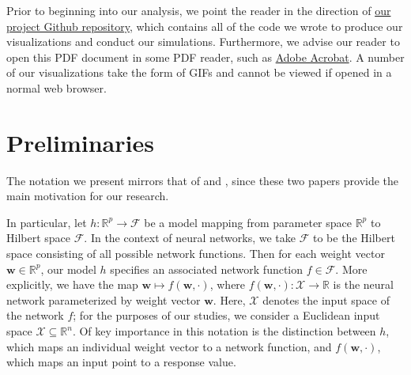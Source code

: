 \documentclass{article}
\begin{document}
Prior to beginning into our analysis, we point the reader in the direction of \href{https://github.com/smithhenryd/NN-Kernel-and-Rich-Regimes}{our project Github repository}, which contains all of the code we wrote to produce our visualizations and conduct our simulations. Furthermore, we advise our reader to open this PDF document in some PDF reader, such as \href{https://www.adobe.com/acrobat/pdf-reader.html}{Adobe Acrobat}. A number of our visualizations take the form of GIFs and cannot be viewed if opened in a normal web browser.

\section{Preliminaries}\label{preliminaries}

The notation we present mirrors that of \cite{chizat2018lazy} and \cite{woodworth2020kernel}, since these two papers provide the main motivation for our research.

In particular, let $h: \mathbb{R}^p \rightarrow \mathcal{F}$ be a model mapping from parameter space $\mathbb{R}^p$ to Hilbert space $\mathcal{F}$. In the context of neural networks, we take $\mathcal{F}$ to be the Hilbert space consisting of all possible network functions. Then for each weight vector $\boldsymbol{w} \in \mathbb{R}^p$, our model $h$ specifies an associated network function $f \in \mathcal{F}$. More explicitly, we have the map $\boldsymbol{w} \mapsto f(\boldsymbol{w}, \cdot)$, where $f(\boldsymbol{w}, \cdot): \mathcal{X} \rightarrow \mathbb{R}$ is the neural network parameterized by weight vector $\boldsymbol{w}$. Here, $\mathcal{X}$ denotes the input space of the network $f$; for the purposes of our studies, we consider a Euclidean input space $\mathcal{X} \subseteq \mathbb{R}^n$. Of key importance in this notation is the distinction between $h$, which maps an individual weight vector to a network function, and $f(\boldsymbol{w}, \cdot)$, which maps an input point to a response value.
\end{document}
